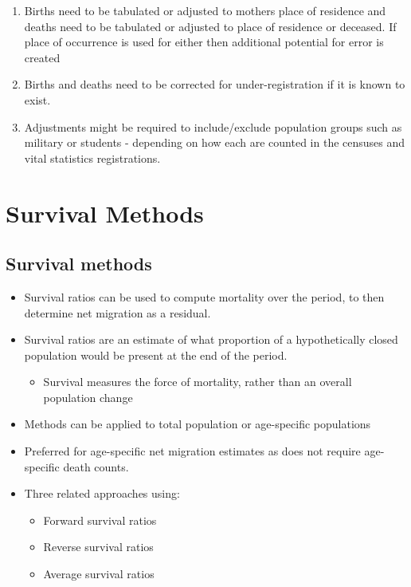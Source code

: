 \documentclass[
]{book}
\providecommand{\tightlist}{%
  \setlength{\itemsep}{0pt}\setlength{\parskip}{0pt}}
\begin{document}
\begin{enumerate}
\def\labelenumi{\arabic{enumi}.}
\setcounter{enumi}{3}
\item
  Births need to be tabulated or adjusted to mothers place of residence and deaths need to be tabulated or adjusted to place of residence or deceased. If place of occurrence is used for either then additional potential for error is created
\item
  Births and deaths need to be corrected for under-registration if it is known to exist.
\item
  Adjustments might be required to include/exclude population groups such as military or students - depending on how each are counted in the censuses and vital statistics registrations.
\end{enumerate}

\hypertarget{survival-methods}{%
\section{Survival Methods}\label{survival-methods}}

\hypertarget{survival-methods-1}{%
\subsection{Survival methods}\label{survival-methods-1}}

\begin{itemize}
\tightlist
\item
  Survival ratios can be used to compute mortality over the period, to then determine net migration as a residual.
\item
  Survival ratios are an estimate of what proportion of a hypothetically closed population would be present at the end of the period.

  \begin{itemize}
  \tightlist
  \item
    Survival measures the force of mortality, rather than an overall population change
  \end{itemize}
\item
  Methods can be applied to total population or age-specific populations
\item
  Preferred for age-specific net migration estimates as does not require age-specific death counts.
\item
  Three related approaches using:

  \begin{itemize}
  \tightlist
  \item
    Forward survival ratios
  \item
    Reverse survival ratios
  \item
    Average survival ratios
  \end{itemize}
\end{itemize}
\end{document}
